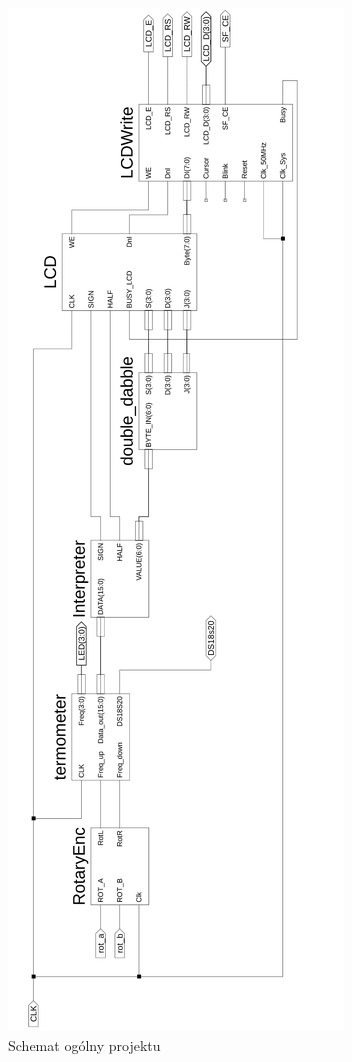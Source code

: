 \documentclass[a4paper]{article}
\begin{document}
\begin{figure}[H]
\begin{center}
\includegraphics{graphics/top_level.png}
\end{center}
\caption{Schemat ogólny projektu}
\label{top_level}
\end{figure}
\end{document}
